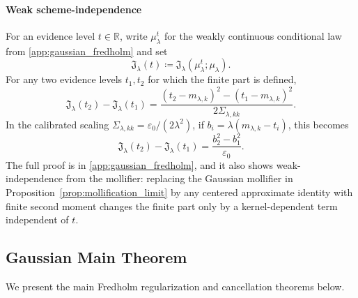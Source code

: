 \documentclass[preprint,12pt]{elsarticle}
\theoremstyle{plain}
\theoremstyle{definition}
\theoremstyle{remark}
\begin{document}
    \paragraph{Weak scheme-independence}
    For an evidence level $t\in\mathbb{R}$, write $\mu_\lambda^t$ for the weakly continuous conditional law from \ref{app:gaussian_fredholm} and set
    \[
    \mathfrak{J}_\lambda(t)\coloneqq
    \mathfrak{J}_\lambda(\mu_\lambda^t;\mu_\lambda).
    \]
    For any two evidence levels $t_1,t_2$ for which the finite part is defined,
    \begin{equation}
        \label{eq:weak_scheme_independence}
        \mathfrak{J}_\lambda(t_2)-\mathfrak{J}_\lambda(t_1)
        =
        \frac{(t_2-m_{\lambda,k})^2-(t_1-m_{\lambda,k})^2}
        {2\Sigma_{\lambda,kk}}.
    \end{equation}
    In the calibrated scaling $\Sigma_{\lambda,kk}=\varepsilon_0/(2\lambda^2)$, if
    $b_i=\lambda(m_{\lambda,k}-t_i)$, this becomes
    \[
    \mathfrak{J}_\lambda(t_2)-\mathfrak{J}_\lambda(t_1)
    =
    \frac{b_2^2-b_1^2}{\varepsilon_0}.
    \]
    The full proof is in \ref{app:gaussian_fredholm}, and it also shows
    weak-independence from the mollifier: replacing the Gaussian mollifier in
    Proposition~\ref{prop:mollification_limit} by any centered approximate identity with
    finite second moment changes the finite part only by a kernel-dependent term
    independent of $t$.

    \subsection{Gaussian Main Theorem}
    \label{sec:gaussian:theorem}

    We present the main Fredholm regularization and cancellation theorems below.
\end{document}
